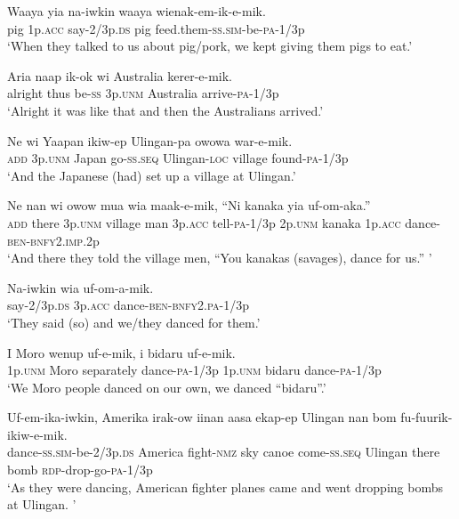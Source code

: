 \ea
\gll  Waaya  yia  na-iwkin  waaya  wienak-em-ik-e-mik. \\
pig  1p.\textsc{acc}  say-2/3p.\textsc{ds}  pig  feed.them{}-\textsc{ss}.\textsc{sim}-be-\textsc{pa}-1/3p \\
\glt ‘When they talked to us about pig/pork, we kept giving them pigs to eat.’ \\
\z


\ea
\gll  Aria  naap  ik-ok  wi  Australia  kerer-e-mik. \\
alright  thus  be-\textsc{ss}  3p.\textsc{unm}  Australia  arrive-\textsc{pa}-1/3p \\
\glt ‘Alright it was like that and then the Australians arrived.’ \\
\z


\ea
\gll  Ne  wi  Yaapan  ikiw-ep  Ulingan-pa  owowa war-e-mik. \\
\textsc{add}  3p.\textsc{unm}  Japan  go-\textsc{ss.seq}  Ulingan-\textsc{loc}  village found-\textsc{pa}-1/3p \\ 
\glt ‘And the Japanese (had) set up a village at Ulingan.’ \\
\z


\ea
\gll  Ne  nan  wi  owow  mua  wia  maak-e-mik, “Ni  kanaka  yia  uf-om-aka.” \\
\textsc{add}  there  3p.\textsc{unm}  village  man  3p.\textsc{acc}  tell-\textsc{pa}-1/3p  2p.\textsc{unm}  kanaka  1p.\textsc{acc}  dance-\textsc{ben}-\textsc{bnfy}2.\textsc{imp}.2p \\ 
\glt ‘And there they told the village men, “You kanakas (savages), dance for us.” ’ \\
\z


\ea
\gll  Na-iwkin  wia  uf-om-a-mik. \\
say-2/3p.\textsc{ds}  3p.\textsc{acc}  dance-\textsc{ben}-\textsc{bnfy}2.\textsc{pa}-1/3p \\
\glt ‘They said (so) and we/they danced for them.’ \\
\z


\ea
\gll  I  Moro  wenup  uf-e-mik, i  bidaru  uf-e-mik. \\
1p.\textsc{unm}  Moro  separately  dance-\textsc{pa}-1/3p 1p.\textsc{unm}  bidaru  dance-\textsc{pa}-1/3p \\ 
\glt ‘We Moro people danced on our own, we danced “bidaru”.’ \\
\z


\ea
\gll  Uf-em-ika-iwkin,  Amerika  irak-ow  iinan  aasa  ekap-ep  Ulingan  nan  bom  fu-fuurik-ikiw-e-mik. \\
dance-\textsc{ss}.\textsc{sim}-be-2/3p.\textsc{ds}  America  fight-\textsc{nmz}  sky  canoe come-\textsc{ss.seq}  Ulingan  there  bomb  \textsc{rdp}-drop-go-\textsc{pa}-1/3p \\ 
\glt ‘As they were dancing, American fighter planes came and went dropping bombs at Ulingan. ’ \\
\z


